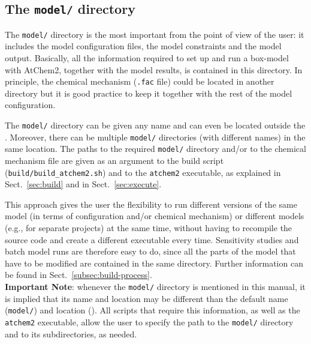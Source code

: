 \subsection{The \texttt{model/} directory} \label{subsec:model-directory}

The \texttt{model/} directory is the most important from the point of
view of the user: it includes the model configuration files, the model
constraints and the model output. Basically, all the information
required to set up and run a box-model with AtChem2, together with the
model results, is contained in this directory. In principle, the
chemical mechanism (\texttt{.fac} file) could be located in another
directory but it is good practice to keep it together with the rest of
the model configuration.

The \texttt{model/} directory can be given any name and can even be
located outside the \maindir. Moreover, there can be multiple
\texttt{model/} directories (with different names) in the same
location. The paths to the required \texttt{model/} directory and/or
to the chemical mechanism file are given as an argument to the build
script (\texttt{build/build\_atchem2.sh}) and to the \texttt{atchem2}
executable, as explained in Sect.~\ref{sec:build} and in
Sect.~\ref{sec:execute}.

This approach gives the user the flexibility to run different versions
of the same model (in terms of configuration and/or chemical
mechanism) or different models (e.g., for separate projects) at the
same time, without having to recompile the source code and create a
different executable every time. Sensitivity studies and batch model
runs are therefore easy to do, since all the parts of the model that
have to be modified are contained in the same directory. Further
information can be found in Sect.~\ref{subsec:build-process}.\\

\textbf{Important Note}: whenever the \texttt{model/} directory is
mentioned in this manual, it is implied that its name and location may
be different than the default name (\texttt{model/}) and location
(\maindir). All scripts that require this information, as well as the
\texttt{atchem2} executable, allow the user to specify the path to the
\texttt{model/} directory and to its subdirectories, as needed.
